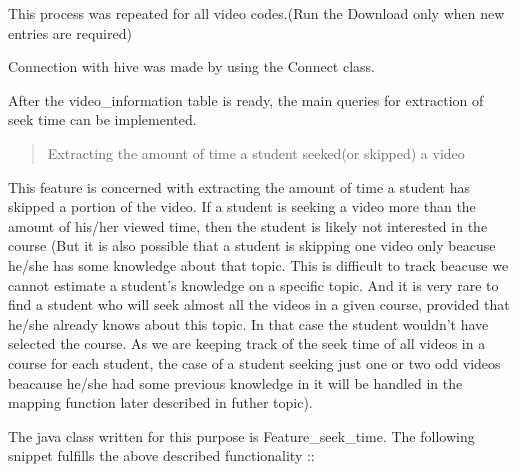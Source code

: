 \documentclass[a4paper,12pt,oneside]{sphinxmanual}
\begin{document}
This process was repeated for all video codes.(Run the Download only when new entries are required)

Connection with hive was made by using the Connect class.

After the video\_information table is ready, the main queries for extraction of seek time can be implemented.
\begin{quote}\begin{description}
\item[{Extracting the amount of time a student seeked(or skipped) a video}] \leavevmode
\end{description}\end{quote}

This feature is concerned with extracting the amount of time a student has skipped a portion of the video. If a student is seeking a video more than the amount of his/her viewed time, then the student is likely not interested in the course (But it is also possible that a student is skipping one video only beacuse he/she has some knowledge about that topic. This is difficult to track beacuse we cannot estimate a student's knowledge on a specific topic. And it is very rare to find a student who will seek almost all the videos in a given course, provided that he/she already knows about this topic. In that case the student wouldn't have selected the course. As we are keeping track of the seek time of all videos in a course for each student, the case of a student seeking just one or two odd videos beacause he/she had some previous knowledge in it will be handled in the mapping function later described in futher topic).

The  java class written for this purpose is Feature\_seek\_time. The following snippet fulfills the above described functionality ::
\end{document}
